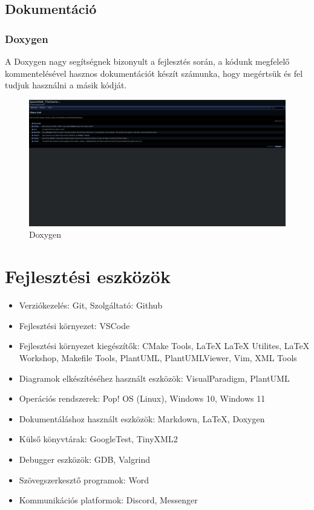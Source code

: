 \documentclass{scrarticle}
\begin{document}
\subsection{Dokumentáció}
\subsubsection{Doxygen}
A Doxygen nagy segítségnek bizonyult a fejlesztés során, a kódunk megfelelő kommentelésével hasznos dokumentációt készít számunka, hogy megértsük és fel tudjuk használni a másik kódját.
\begin{figure}[H]
    \includegraphics[width=1.0\columnwidth]{doxygen_sample.png}
    \caption{Doxygen}\label{fig:8}
\end{figure}

\section{Fejlesztési eszközök}
\begin{itemize}
    \item Verziókezelés: Git, Szolgáltató: Github
    \item Fejlesztési környezet: VSCode
    \item Fejlesztési környezet kiegészítők: CMake Tools, LaTeX LaTeX Utilites, LaTeX Workshop, Makefile Tools, PlantUML, PlantUMLViewer, Vim, XML Tools
    \item Diagramok elkészítéséhez használt eszközök: VisualParadigm, PlantUML
    \item Operációs rendszerek: Pop! OS (Linux), Windows 10, Windows 11
    \item Dokumentáláshoz használt eszközök: Markdown, LaTeX, Doxygen
    \item Külső könyvtárak: GoogleTest, TinyXML2
    \item Debugger eszközök: GDB, Valgrind
    \item Szövegszerkesztő programok: Word
    \item Kommunikációs platformok: Discord, Messenger
\end{itemize}
\end{document}
